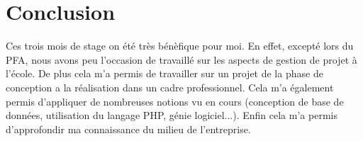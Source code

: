 \chapter*{Conclusion}

Ces trois mois de stage on été très bénèfique pour moi. En effet, excepté lors du PFA, nous avons peu l'occasion de travaillé sur les aspects de gestion de projet à l'école. De plus cela m'a permis de travailler sur un projet de la phase de conception a la réalisation dans un cadre professionnel. Cela m'a également permis d'appliquer de nombreuses notions vu en cours (conception de base de données, utilisation du langage PHP, génie logiciel...).
Enfin cela m'a permis d'approfondir ma connaissance du milieu de l'entreprise.
